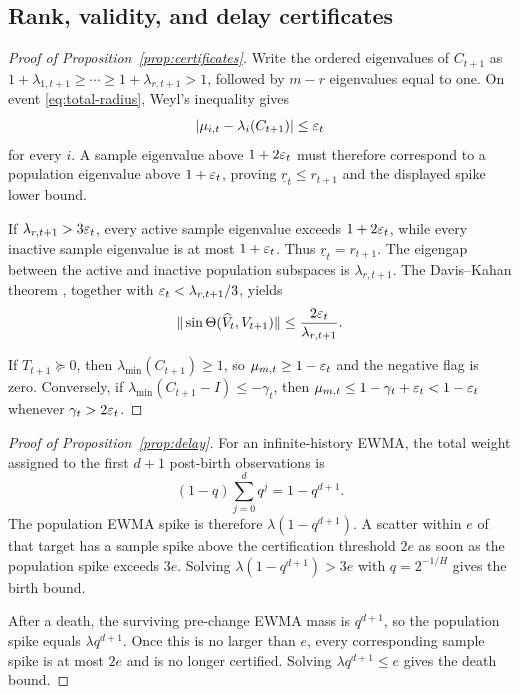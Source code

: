 \subsection{Rank, validity, and delay certificates}

\begin{proof}[Proof of Proposition~\ref{prop:certificates}]
Write the ordered eigenvalues of $C_{t+1}$ as
$1+\lambda_{1,t+1}\ge\cdots\ge1+\lambda_{r,t+1}>1$, followed by $m-r$ eigenvalues equal to one.  On event \eqref{eq:total-radius}, Weyl's inequality gives
\begin{equation}
 |\mu_{i,t}-\lambda_i(C_{t+1})|\le\varepsilon_t
\end{equation}
for every $i$.  A sample eigenvalue above $1+2\varepsilon_t$ must therefore correspond to a population eigenvalue above $1+\varepsilon_t$, proving $\underline r_t\le r_{t+1}$ and the displayed spike lower bound.

If $\lambda_{r,t+1}>3\varepsilon_t$, every active sample eigenvalue exceeds $1+2\varepsilon_t$, while every inactive sample eigenvalue is at most $1+\varepsilon_t$.  Thus $\underline r_t=r_{t+1}$.  The eigengap between the active and inactive population subspaces is $\lambda_{r,t+1}$.  The Davis--Kahan theorem \citep{davis1970,yu2015}, together with $\varepsilon_t<\lambda_{r,t+1}/3$, yields
\begin{equation}
 \|\sin\Theta(\widehat V_t,V_{t+1})\|
 \le \frac{2\varepsilon_t}{\lambda_{r,t+1}}.
\end{equation}

If $T_{t+1}\succeq0$, then $\lambda_{\min}(C_{t+1})\ge1$, so
$\mu_{m,t}\ge1-\varepsilon_t$ and the negative flag is zero.  Conversely, if
$\lambda_{\min}(C_{t+1}-I)\le-\gamma_t$, then
$\mu_{m,t}\le1-\gamma_t+\varepsilon_t<1-\varepsilon_t$ whenever $\gamma_t>2\varepsilon_t$.
\end{proof}

\begin{proof}[Proof of Proposition~\ref{prop:delay}]
For an infinite-history EWMA, the total weight assigned to the first $d+1$ post-birth observations is
\begin{equation}
 (1-q)\sum_{j=0}^{d}q^j=1-q^{d+1}.
\end{equation}
The population EWMA spike is therefore $\lambda(1-q^{d+1})$.  A scatter within $e$ of that target has a sample spike above the certification threshold $2e$ as soon as the population spike exceeds $3e$.  Solving
$\lambda(1-q^{d+1})>3e$ with $q=2^{-1/H}$ gives the birth bound.

After a death, the surviving pre-change EWMA mass is $q^{d+1}$, so the population spike equals $\lambda q^{d+1}$.  Once this is no larger than $e$, every corresponding sample spike is at most $2e$ and is no longer certified.  Solving $\lambda q^{d+1}\le e$ gives the death bound.
\end{proof}

